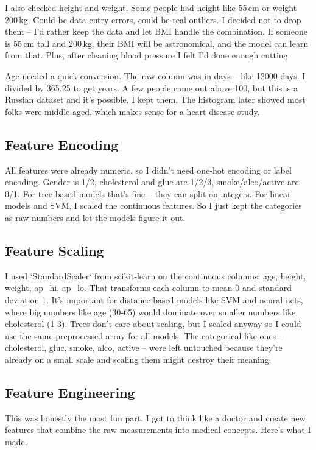 \documentclass[11pt, a4paper, oneside]{book}
\begin{document}
I also checked height and weight. Some people had height like 55 cm or weight 200 kg. Could be data entry errors, could be real outliers. I decided not to drop them – I’d rather keep the data and let BMI handle the combination. If someone is 55 cm tall and 200 kg, their BMI will be astronomical, and the model can learn from that. Plus, after cleaning blood pressure I felt I’d done enough cutting.

Age needed a quick conversion. The raw column was in days – like 12000 days. I divided by 365.25 to get years. A few people came out above 100, but this is a Russian dataset and it’s possible. I kept them. The histogram later showed most folks were middle‑aged, which makes sense for a heart disease study.

\subsection{Feature Encoding}
All features were already numeric, so I didn’t need one‑hot encoding or label encoding. Gender is 1/2, cholesterol and gluc are 1/2/3, smoke/alco/active are 0/1. For tree‑based models that’s fine – they can split on integers. For linear models and SVM, I scaled the continuous features. So I just kept the categories as raw numbers and let the models figure it out.

\subsection{Feature Scaling}
I used `StandardScaler` from scikit‑learn on the continuous columns: age, height, weight, ap\_hi, ap\_lo. That transforms each column to mean 0 and standard deviation 1. It’s important for distance‑based models like SVM and neural nets, where big numbers like age (30‑65) would dominate over smaller numbers like cholesterol (1‑3). Trees don’t care about scaling, but I scaled anyway so I could use the same preprocessed array for all models. The categorical‑like ones – cholesterol, gluc, smoke, alco, active – were left untouched because they’re already on a small scale and scaling them might destroy their meaning.

\subsection{Feature Engineering}
This was honestly the most fun part. I got to think like a doctor and create new features that combine the raw measurements into medical concepts. Here’s what I made.
\end{document}
